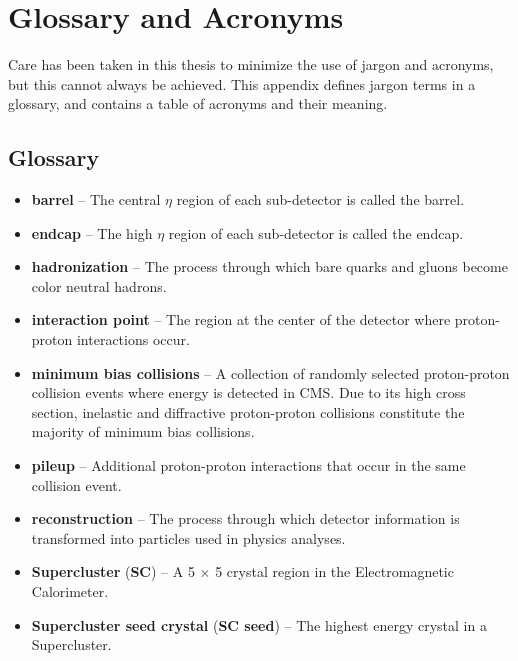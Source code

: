 \chapter{Glossary and Acronyms}
\label{app_glossary}
Care has been taken in this thesis to minimize the use of jargon and
acronyms, but this cannot always be achieved.  This appendix defines
jargon terms in a glossary, and contains a table of acronyms and their
meaning.

\section{Glossary}
\label{jargonapp}
\begin{itemize}

	\item \textbf{barrel} -- The central $\eta$ region of each sub-detector is 
		called the barrel.
	\item \textbf{endcap} -- The high $\eta$ region of each sub-detector is 
		called the endcap.
	\item \textbf{hadronization} -- The process through which bare quarks and 
		gluons become color neutral hadrons.
	\item \textbf{interaction point} -- The region at the center of the detector 
		where proton-proton interactions occur.
	\item \textbf{minimum bias collisions} -- A collection of randomly selected 
		proton-proton collision events where energy is detected in CMS.  Due to 
		its high cross section, inelastic and diffractive proton-proton collisions 
		constitute the majority of minimum bias collisions.
	\item \textbf{pileup} -- Additional proton-proton interactions that occur 
		in the same collision event.
	\item \textbf{reconstruction} -- The process through which detector information 
		is transformed into particles used in physics analyses.
	\item \textbf{Supercluster} (\textbf{SC}) -- A 5 $\times$ 5 crystal region 
		in the Electromagnetic Calorimeter.
	\item \textbf{Supercluster seed crystal} (\textbf{SC seed}) -- The highest 
		energy crystal in a Supercluster.
\end{itemize}


